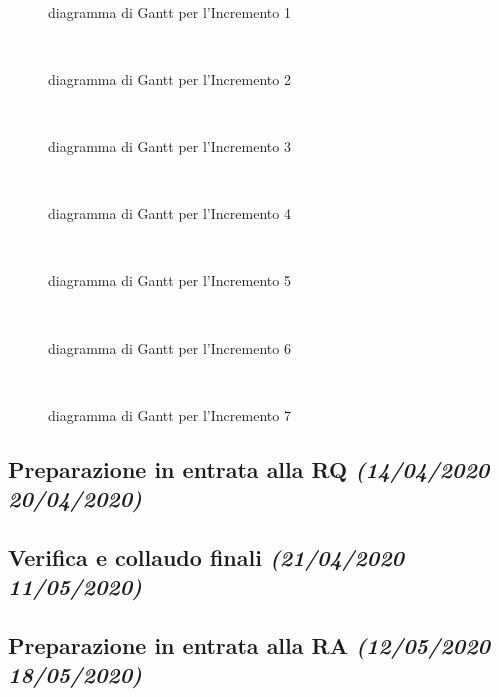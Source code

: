 \documentclass[../piano-di-progetto.tex]{subfiles}
\begin{document}
\begin{figure}[H]
  \centering
  
  \caption{diagramma di Gantt per l'Incremento 1}%
~~\label{fig:gantt_incremento_1}
\end{figure}
\begin{figure}[H]
  \centering
  
  \caption{diagramma di Gantt per l'Incremento 2}%
~~\label{fig:gantt_incremento_2}
\end{figure}
\begin{figure}[H]
  \centering
  
  \caption{diagramma di Gantt per l'Incremento 3}%
~~\label{fig:gantt_incremento_3}
\end{figure}
\begin{figure}[H]
  \centering
  
  \caption{diagramma di Gantt per l'Incremento 4}%
~~\label{fig:gantt_incremento_4}
\end{figure}
\begin{figure}[H]
  \centering
  
  \caption{diagramma di Gantt per l'Incremento 5}%
~~\label{fig:gantt_incremento_5}
\end{figure}
\begin{figure}[H]
  \centering
  
  \caption{diagramma di Gantt per l'Incremento 6}%
~~\label{fig:gantt_incremento_6}
\end{figure}
\begin{figure}[H]
  \centering
  
  \caption{diagramma di Gantt per l'Incremento 7}%
~~\label{fig:gantt_incremento_7}
\end{figure}
\subsection[Preparazione in entrata alla RQ]{Preparazione in entrata alla RQ {\normalsize\normalfont\itshape(14/04/2020  20/04/2020)}}%
\label{sub:preparazione_in_entrata_alla_rq}
\subsection[Verifica e collaudo finali]{Verifica e collaudo finali {\normalsize\normalfont\itshape(21/04/2020  11/05/2020)}}%
\label{sub:verifica_e_collaudo_finali}
\subsection[Preparazione in entrata alla RA]{Preparazione in entrata alla RA {\normalsize\normalfont\itshape(12/05/2020  18/05/2020)}}%
\label{sub:preparazione_in_entrata_alla_ra}
\end{document}

